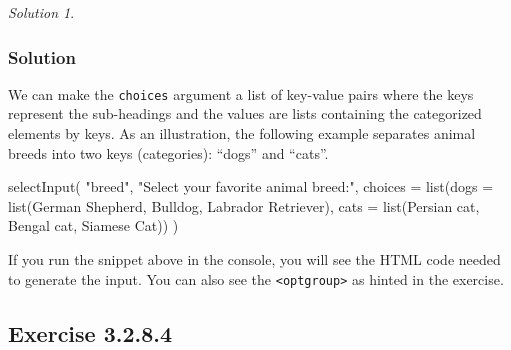 \documentclass[
]{book}
\newenvironment{Shaded}{\begin{snugshade}}{\end{snugshade}}
\newcommand{\AttributeTok}[1]{\textcolor[rgb]{0.77,0.63,0.00}{#1}}
\newcommand{\FunctionTok}[1]{\textcolor[rgb]{0.00,0.00,0.00}{#1}}
\newcommand{\NormalTok}[1]{#1}
\newcommand{\OtherTok}[1]{\textcolor[rgb]{0.56,0.35,0.01}{#1}}
\newcommand{\StringTok}[1]{\textcolor[rgb]{0.31,0.60,0.02}{#1}}
\theoremstyle{definition}
\theoremstyle{definition}
\theoremstyle{definition}
\theoremstyle{definition}
\theoremstyle{remark}
\newtheorem*{solution}{Solution}
\begin{document}
\begin{solution}
\leavevmode

\hypertarget{solution-7}{%
\subsubsection*{Solution}\label{solution-7}}

We can make the \texttt{choices} argument a list of key-value pairs where the keys
represent the sub-headings and the values are lists containing the categorized
elements by keys. As an illustration, the following example separates animal breeds into two keys (categories): ``dogs'' and ``cats''.

\begin{Shaded}
\begin{Highlighting}[]
\FunctionTok{selectInput}\NormalTok{(}
  \StringTok{"breed"}\NormalTok{,}
  \StringTok{"Select your favorite animal breed:"}\NormalTok{,}
  \AttributeTok{choices =}
    \FunctionTok{list}\NormalTok{(}\StringTok{\textasciigrave{}}\AttributeTok{dogs}\StringTok{\textasciigrave{}} \OtherTok{=} \FunctionTok{list}\NormalTok{(}\StringTok{\textquotesingle{}German Shepherd\textquotesingle{}}\NormalTok{, }\StringTok{\textquotesingle{}Bulldog\textquotesingle{}}\NormalTok{, }\StringTok{\textquotesingle{}Labrador Retriever\textquotesingle{}}\NormalTok{),}
         \StringTok{\textasciigrave{}}\AttributeTok{cats}\StringTok{\textasciigrave{}} \OtherTok{=} \FunctionTok{list}\NormalTok{(}\StringTok{\textquotesingle{}Persian cat\textquotesingle{}}\NormalTok{, }\StringTok{\textquotesingle{}Bengal cat\textquotesingle{}}\NormalTok{, }\StringTok{\textquotesingle{}Siamese Cat\textquotesingle{}}\NormalTok{))}
\NormalTok{)}
\end{Highlighting}
\end{Shaded}

If you run the snippet above in the console, you will see the HTML code needed
to generate the input. You can also see the \texttt{\textless{}optgroup\textgreater{}} as hinted in the
exercise.

\end{solution}

\hypertarget{exercise-3.2.8.4}{%
\subsection*{Exercise 3.2.8.4}\label{exercise-3.2.8.4}}
\end{document}

